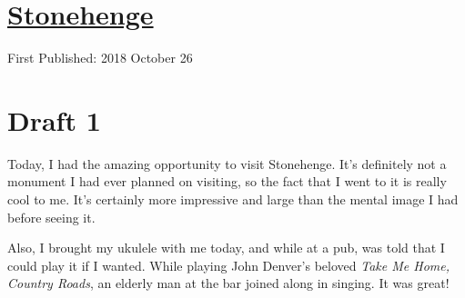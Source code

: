 \documentclass[12pt]{article}[titlepage]
\newcommand{\1}{\={a}}
\newcommand{\2}{\={e}}
\newcommand{\3}{\={\i}}
\newcommand{\4}{\=o}
\newcommand{\5}{\=u}
\newcommand{\6}{\={A}}
\renewcommand{\,}{\textsuperscript{,}}
\begin{document}
\doublespacing
\section{\href{stonehenge.html}{Stonehenge}}
First Published: 2018 October 26
\section{Draft 1}
Today, I had the amazing opportunity to visit Stonehenge.
It's definitely not a monument I had ever  planned on visiting, so the fact that I went to it is really cool to me.
It's certainly more impressive and large than the mental image I had before seeing it.

Also, I brought my ukulele with me today, and while at a pub, was told that I could play it if I wanted.
While playing John Denver's beloved \textit{Take Me Home, Country Roads}, an elderly man at the bar joined along in singing.
It was great!
\end{document}
